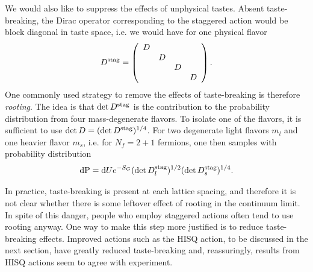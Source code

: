 We would also like to suppress the effects of unphysical tastes. Absent
taste-breaking, the Dirac operator corresponding to the staggered action
would be block diagonal in taste space, i.e. we would have for 
one physical flavor
\begin{equation}
D^{\rm stag}=\left(\begin{array}{cccc}
            D &   &  &  \\
              & D &  &  \\
              &   & D&  \\
              &   &  & D\\
            \end{array}\right).
\end{equation}
One commonly used strategy to remove the effects of taste-breaking is
therefore {\it rooting}. The idea is that $\det D^{\rm stag}$ is
the contribution to the probability distribution from four mass-degenerate
flavors. To isolate one of the flavors, it is sufficient to use
$\det D=(\det D^{\rm stag})^{1/4}$. For two degenerate light flavors
$m_l$ and one heavier flavor $m_s$, i.e. for $N_f=2+1$ fermions, 
one then samples with probability distribution
\begin{equation}\label{eq:HISQdist}
  \dd{\rm P}
    =\dd Ue^{-S_G}(\det D_l^{\rm stag})^{1/2}(\det D_s^{\rm stag})^{1/4}.
\end{equation}

In practice, taste-breaking is present at each lattice spacing, and
therefore it is not clear whether there is some leftover effect of rooting
in the continuum limit. In spite of this danger, people who employ staggered
actions often tend to use rooting anyway. One way to make this step more
justified is to reduce taste-breaking effects. Improved actions such
as the HISQ action, to be discussed in the next section, have greatly
reduced taste-breaking and, reassuringly, results from HISQ actions
seem to agree with experiment.


